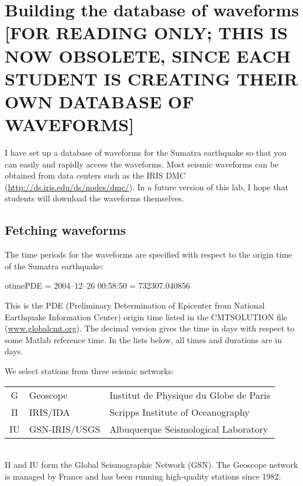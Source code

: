 \documentclass[11pt,titlepage,fleqn]{article}
\begin{document}

\iffalse

\section{Building the database of waveforms [FOR READING ONLY; THIS IS NOW OBSOLETE, SINCE EACH STUDENT IS CREATING THEIR OWN DATABASE OF WAVEFORMS]}

I have set up a database of waveforms for the Sumatra earthquake so that you can easily and rapidly access the waveforms. Most seismic waveforms can be obtained from data centers such as the IRIS DMC (\url{http://ds.iris.edu/ds/nodes/dmc/}). In a future version of this lab, I hope that students will download the waveforms themselves.

\subsection{Fetching waveforms}

\medskip\noindent
The time periods for the waveforms are specified with respect to the origin time of the Sumatra earthquake:

\vspace{0.5cm}
otimePDE = 2004--12--26 00:58:50 = 732307.040856
\vspace{0.5cm}

\noindent
This is the PDE (Preliminary Determination of Epicenter from National Earthquake Information Center) origin time listed in the CMTSOLUTION file (\url{www.globalcmt.org}). The decimal version gives the time in days with respect to some Matlab reference time. In the lists below, all times and durations are in days.

\medskip\noindent
We select stations from three seismic networks: \\

\begin{tabular}{cll}
\hline
G   & Geoscope      & Institut de Physique du Globe de Paris \\
II  & IRIS/IDA      & Scripps Institute of Oceanography \\
IU  & GSN-IRIS/USGS & Albuquerque Seismological Laboratory \\
\hline
\end{tabular} \\

\noindent
II and IU form the Global Seismographic Network (GSN).
The Geoscope network is managed by France and has been running high-quality stations since 1982.
\end{document}

